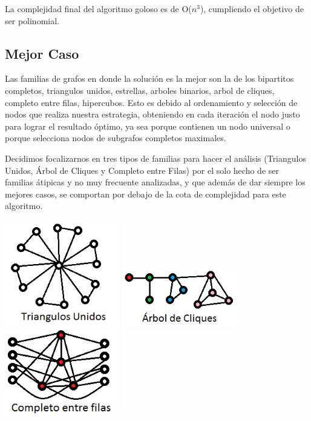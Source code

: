 La complejidad final del algoritmo goloso es de O($n^3$), cumpliendo el objetivo de ser polinomial.

\subsection{Mejor Caso}

Las familias de grafos en donde la solución es la mejor son la de los bipartitos completos, triangulos unidos, estrellas, arboles binarios, arbol de cliques, completo entre filas, hipercubos. Esto es debido al ordenamiento y selección de nodos que realiza nuestra estrategia, obteniendo en cada iteración el nodo justo para lograr el resultado óptimo, ya sea porque contienen un nodo universal o porque selecciona nodos de subgrafos completos maximales.

Decidimos focalizarnos en tres tipos de familias para hacer el análisis (Triangulos Unidos, Árbol de Cliques y Completo entre Filas) por el solo hecho de ser familias átipicas y no muy frecuente analizadas, y que además de dar siempre los mejores casos, se comportan por debajo de la cota de complejidad para este algoritmo.

\includegraphics[width=5cm]{./graficos/triangulosunidos.png}
\includegraphics[width=5cm]{./graficos/cliquetree.png}
\includegraphics[width=5cm]{./graficos/completoentrefilas.png}

